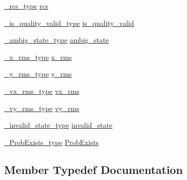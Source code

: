 \begin{DoxyCompactItemize}
\item 
\hyperlink{structconti__radar_1_1ContiRadar___a54a5686feab91c3c0cbd68cdb6bee7db}{\+\_\+rcs\+\_\+type} \hyperlink{structconti__radar_1_1ContiRadar___a76c90c92aba75c35d6eb4d25251cc632}{rcs}
\item 
\hyperlink{structconti__radar_1_1ContiRadar___a03d5186874dd855dae68a07e423d9825}{\+\_\+is\+\_\+quality\+\_\+valid\+\_\+type} \hyperlink{structconti__radar_1_1ContiRadar___acb77fa07667b08847e84a27763973690}{is\+\_\+quality\+\_\+valid}
\item 
\hyperlink{structconti__radar_1_1ContiRadar___a193834825a012bc4ef64220db985d2eb}{\+\_\+ambig\+\_\+state\+\_\+type} \hyperlink{structconti__radar_1_1ContiRadar___a0ffefdeb29b98362f221ac2d787265eb}{ambig\+\_\+state}
\item 
\hyperlink{structconti__radar_1_1ContiRadar___adcb79fb27779e557e948addd1832938f}{\+\_\+x\+\_\+rms\+\_\+type} \hyperlink{structconti__radar_1_1ContiRadar___a4d7137d6aa1dcd1f1724fd4e09a16704}{x\+\_\+rms}
\item 
\hyperlink{structconti__radar_1_1ContiRadar___ae6571fef76edb2dfe79da331614ddcc5}{\+\_\+y\+\_\+rms\+\_\+type} \hyperlink{structconti__radar_1_1ContiRadar___afba0c3f3a38b887c9c044ad6372f053a}{y\+\_\+rms}
\item 
\hyperlink{structconti__radar_1_1ContiRadar___acae61db5456424612b9f89f891b8f65f}{\+\_\+vx\+\_\+rms\+\_\+type} \hyperlink{structconti__radar_1_1ContiRadar___a81b86774c20ba76f43bbed573635dfd8}{vx\+\_\+rms}
\item 
\hyperlink{structconti__radar_1_1ContiRadar___a25654e54b73dd98b761e31b5fb022d20}{\+\_\+vy\+\_\+rms\+\_\+type} \hyperlink{structconti__radar_1_1ContiRadar___a2f8cabc04a26dfb723121996c8b82c00}{vy\+\_\+rms}
\item 
\hyperlink{structconti__radar_1_1ContiRadar___a2a59a60898931fdd385414285db0ddb7}{\+\_\+invalid\+\_\+state\+\_\+type} \hyperlink{structconti__radar_1_1ContiRadar___acc4007bdcd484feb993ac40e86f713c1}{invalid\+\_\+state}
\item 
\hyperlink{structconti__radar_1_1ContiRadar___a130da4dcf3dfa54c90c29a54f91d921c}{\+\_\+\+Prob\+Exists\+\_\+type} \hyperlink{structconti__radar_1_1ContiRadar___a0fe5d37ec3b23b7b53e378f423fbf37d}{Prob\+Exists}
\end{DoxyCompactItemize}


\subsection{Member Typedef Documentation}
\mbox{\label{structconti__radar_1_1ContiRadar___a193834825a012bc4ef64220db985d2eb}} 
